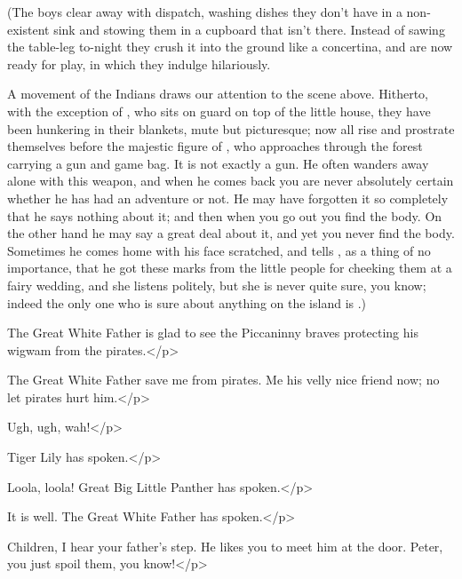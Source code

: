 \begin{stagedir}
(The boys clear away with dispatch,
washing dishes they don't have in a non-existent sink and stowing them in a cupboard that isn't there.
Instead of sawing the table-leg to-night they crush it into the ground like a concertina,
and are now ready for play, in which they indulge hilariously.

A movement of the Indians draws our attention to the scene above.
Hitherto, with the exception of \panther, who sits on guard on top of the little house,
they have been hunkering in their blankets, mute but picturesque;
now all rise and prostrate themselves before the majestic figure of \peter,
who approaches through the forest carrying a gun and game bag.
It is not exactly a gun.
He often wanders away alone with this weapon,
and when he comes back you are never absolutely certain whether he has had an adventure or not.
He may have forgotten it so completely that he says nothing about it;
and then when you go out you find the body.
On the other hand he may say a great deal about it, and yet you never find the body.
Sometimes he comes home with his face scratched,
and tells \wendy, as a thing of no importance,
that he got these marks from the little people for cheeking them at a fairy wedding,
and she listens politely, but she is never quite sure, you know;
indeed the only one who is sure about anything on the island is \peter.)
\end{stagedir}

\peterspeaks
The Great White Father is glad to see the Piccaninny braves protecting his wigwam from the pirates.</p>

\tigerlilyspeaks
The Great White Father save me from pirates.
Me his velly nice friend now;
no let pirates hurt him.</p>

Ugh, ugh, wah!</p>

\tigerlilyspeaks
Tiger Lily has spoken.</p>

\pantherspeaks
Loola, loola!
Great Big Little Panther has spoken.</p>

\peterspeaks
It is well.
The Great White Father has spoken.</p>


\wendyspeaks
Children, I hear your father's step.
He likes you to meet him at the door.
Peter, you just spoil them, you know!</p>

